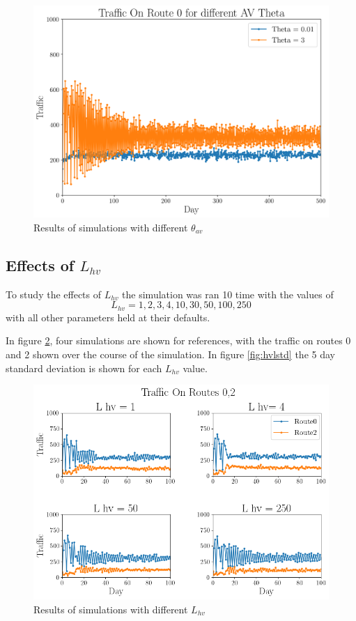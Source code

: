 \documentclass[12pt, a4paper, onecolumn]{article}
\begin{document}
\begin{figure}[h!]
	\centering
	\includegraphics[scale=.5]{av_th3001_std.png}
	\caption{Results of simulations with different $\theta_{av}$}
	\label{fig:avth3001}
	\end{figure}
	
\subsection{Effects of $L_{hv}$}
To study the effects of $L_{hv}$ the simulation was ran 10 time with the values of
$$ L_{hv} = 1, 2, 3, 4 , 10, 30, 50, 100, 250$$
with all other parameters held at their defaults.

In figure \ref{fig:hvlgrid}, four simulations are shown for references, with the traffic on routes 0 and 2 shown over the course of the simulation. In figure \ref{fig:hvlstd} the 5 day standard deviation is shown for each $L_{hv}$ value.

\begin{figure}[h!]
	\centering
	\includegraphics[scale=.5]{hv_l_grid.png}
	\caption{Results of simulations with different $L_{hv}$}
	\label{fig:hvlgrid}
	\end{figure}
\end{document}
